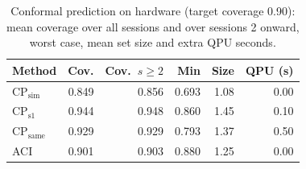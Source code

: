 \begin{table}[t]
\centering
\caption{Conformal prediction on hardware (target coverage 0.90): mean coverage over all sessions and over sessions 2 onward, worst case, mean set size and extra QPU seconds.}
\label{tab:coverage}
\footnotesize
\setlength{\tabcolsep}{3.5pt}
\begin{tabular}{lrrrrr}
\toprule
Method & Cov. & Cov.\ $s\geq2$ & Min & Size & QPU (s) \\
\midrule
CP$_{\mathrm{sim}}$ & 0.849 & 0.856 & 0.693 & 1.08 & 0.00 \\
CP$_{\mathrm{s1}}$ & 0.944 & 0.948 & 0.860 & 1.45 & 0.10 \\
CP$_{\mathrm{same}}$ & 0.929 & 0.929 & 0.793 & 1.37 & 0.50 \\
ACI & 0.901 & 0.903 & 0.880 & 1.25 & 0.00 \\
\bottomrule
\end{tabular}
\end{table}
